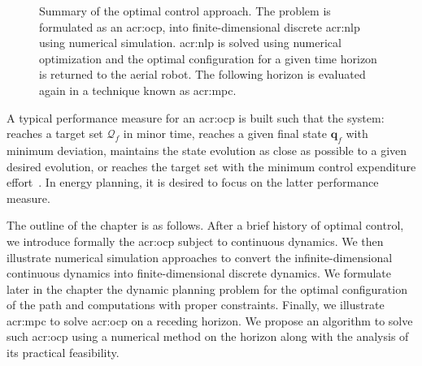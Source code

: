 \begin{figure}[!h]
    \centering
    \footnotesize
    \caption[Summary of the optimal control approach]{Summary of the optimal control approach. The problem is formulated as an \Gls{acr:ocp}, into finite-dimensional discrete \Gls{acr:nlp} using numerical simulation. \Gls{acr:nlp} is solved using numerical optimization and the optimal configuration for a given time horizon is returned to the aerial robot. The following horizon is evaluated again in a technique known as \Gls{acr:mpc}.}
    \label{fig:opt:process-summary}
\end{figure}

A typical performance measure for an \Gls{acr:ocp} is built such that the system: reaches a target set $\mathcal{Q}_f$ in minor time, reaches a given final state $\mathbf{q}_f$ with minimum deviation, maintains the state evolution as close as possible to a given desired evolution, or reaches the target set with the minimum control expenditure effort~\citep{kirk2004optimal}. In energy planning, it is desired to focus on the latter performance measure. 

The outline of the chapter is as follows. After a brief history of optimal control, we introduce formally the \Gls{acr:ocp} subject to continuous dynamics. We then illustrate numerical simulation approaches to convert the infinite-dimensional continuous dynamics into finite-dimensional discrete dynamics. We formulate later in the chapter the dynamic planning problem for the optimal configuration of the path and computations with proper constraints. Finally, we illustrate \Gls{acr:mpc} to solve \Gls{acr:ocp} on a receding horizon. We propose an algorithm to solve such \Gls{acr:ocp} using a numerical method on the horizon along with the analysis of its practical feasibility.

